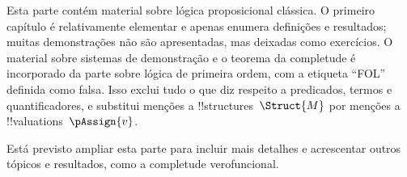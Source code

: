 \documentclass[../../include/open-logic-part]{subfiles}
\begin{document}

\begin{editorial}
  Esta parte contém material sobre lógica proposicional clássica. O
  primeiro capítulo é relativamente elementar e apenas enumera definições
  e resultados; muitas demonstrações não são apresentadas, mas deixadas como
  exercícios. O material sobre sistemas de demonstração e o teorema da
  completude é incorporado da parte sobre lógica de primeira ordem, com a
  etiqueta ``FOL'' definida como falsa. Isso exclui tudo o que diz respeito a
  predicados, termos e quantificadores, e substitui menções a
  !!{structure}s~$\Struct{M}$ por menções a
  !!{valuation}s~$\pAssign{v}$.

  Está previsto ampliar esta parte para incluir
  mais detalhes e acrescentar outros tópicos e resultados, como a
  completude verofuncional.
\end{editorial}










\OLEndPartHook
\end{document}
